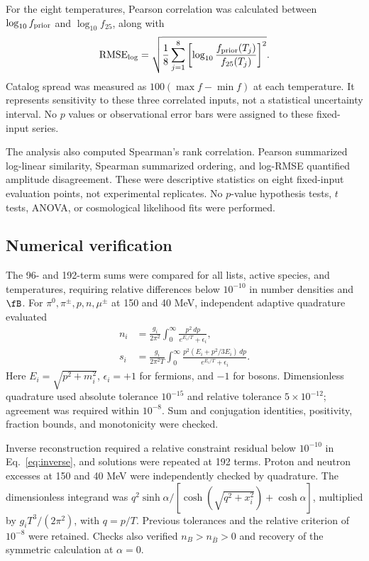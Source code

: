 For the eight temperatures, Pearson correlation was calculated between $\log_{10}f_{\rm prior}$ and $\log_{10}f_{25}$, along with
\begin{equation}
{\rm RMSE}_{\log}=
\sqrt{\frac{1}{8}\sum_{j=1}^{8}
\left[\log_{10}\frac{f_{\rm prior}(T_j)}{f_{25}(T_j)}\right]^2}.
\end{equation}
Catalog spread was measured as $100(\max f-\min f)$ at each temperature. It represents sensitivity to these three correlated inputs, not a statistical uncertainty interval. No $p$ values or observational error bars were assigned to these fixed-input series.

The analysis also computed Spearman's rank correlation. Pearson summarized log-linear similarity, Spearman summarized ordering, and log-RMSE quantified amplitude disagreement. These were descriptive statistics on eight fixed-input evaluation points, not experimental replicates. No $p$-value hypothesis tests, $t$ tests, ANOVA, or cosmological likelihood fits were performed.

\subsection{Numerical verification}
The 96- and 192-term sums were compared for all lists, active species, and temperatures, requiring relative differences below $10^{-10}$ in number densities and $\fB$. For $\pi^0,\pi^\pm,p,n,\mu^\pm$ at 150 and 40 MeV, independent adaptive quadrature evaluated
\begin{align}
n_i&=\frac{g_i}{2\pi^2}\int_0^\infty
\frac{p^2\,dp}{e^{E_i/T}+\epsilon_i},\label{eq:numberintegral}\\
s_i&=\frac{g_i}{2\pi^2T}\int_0^\infty
\frac{p^2(E_i+p^2/3E_i)\,dp}{e^{E_i/T}+\epsilon_i}.
\end{align}
Here $E_i=\sqrt{p^2+m_i^2}$, $\epsilon_i=+1$ for fermions, and $-1$ for bosons. Dimensionless quadrature used absolute tolerance $10^{-15}$ and relative tolerance $5\times10^{-12}$; agreement was required within $10^{-8}$. Sum and conjugation identities, positivity, fraction bounds, and monotonicity were checked.

Inverse reconstruction required a relative constraint residual below $10^{-10}$ in Eq.~\eqref{eq:inverse}, and solutions were repeated at 192 terms. Proton and neutron excesses at 150 and 40 MeV were independently checked by quadrature. The dimensionless integrand was $q^2\sinh\alpha/[\cosh(\sqrt{q^2+x_i^2})+\cosh\alpha]$, multiplied by $g_iT^3/(2\pi^2)$, with $q=p/T$. Previous tolerances and the relative criterion of $10^{-8}$ were retained. Checks also verified $n_B>n_{\bar B}>0$ and recovery of the symmetric calculation at $\alpha=0$.
